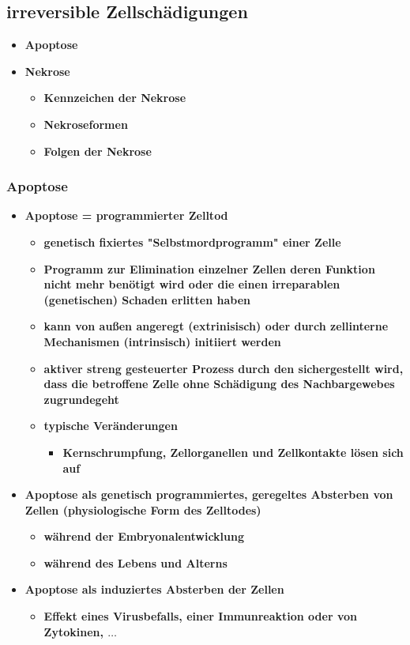 \subsection{irreversible Zellschädigungen}
	\begin{itemize}
		\item \textbf{Apoptose}
		\item \textbf{Nekrose}
			\begin{itemize}
				\item \textbf{Kennzeichen der Nekrose}
				\item \textbf{Nekroseformen}
				\item \textbf{Folgen der Nekrose}
			\end{itemize}
	\end{itemize}

\subsubsection{Apoptose}
	\begin{itemize}
		\item \textbf{Apoptose = programmierter Zelltod}
			\begin{itemize}
				\item \textbf{genetisch fixiertes "Selbstmordprogramm" einer Zelle}
				\item \textbf{Programm zur Elimination einzelner Zellen deren Funktion nicht mehr benötigt wird oder die einen irreparablen (genetischen) Schaden erlitten haben}
				\item \textbf{kann von außen angeregt (extrinisisch) oder durch  zellinterne Mechanismen (intrinsisch) initiiert werden}
				\item \textbf{aktiver streng gesteuerter Prozess durch den sichergestellt wird, dass die betroffene Zelle ohne Schädigung des Nachbargewebes zugrundegeht}
				\item \textbf{typische Veränderungen}
					\begin{itemize}
						\item \textbf{Kernschrumpfung, Zellorganellen und Zellkontakte lösen sich auf}
					\end{itemize}
			\end{itemize}
		\item \textbf{Apoptose als genetisch programmiertes, geregeltes Absterben von Zellen (physiologische Form des Zelltodes)}
			\begin{itemize}
				\item \textbf{während der Embryonalentwicklung}
				\item \textbf{während des Lebens und Alterns}
			\end{itemize}
		\item \textbf{Apoptose als induziertes Absterben der Zellen}
			\begin{itemize}
				\item \textbf{Effekt eines Virusbefalls, einer Immunreaktion oder von Zytokinen, $\dots$}
			\end{itemize}
	\end{itemize}

